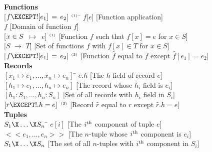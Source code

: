 \documentclass[fleqn,leqno]{article}
\newcommand{\notemark}[1]{$^{\mbox{\tiny(#1)}}$}
\begin{document}
{\begin{tabbing}
%
{\bf \hspace*{-1em}Functions}\\
{[}$f \EXCEPT ![e_{1}]\,=\,e_{2}$] \notemark{1} 
  \hspace{.5em}\= \kill
$f$[$e$] \>
  {\small [Function application]}\\
\DOMAIN $f$ \> \small [Domain of function $f$] \\
{[}$x\in S$~$\mapsto$\ $\!e$] \notemark{1} 
  \> \small [Function $f$ such that $f[x]=e$ for $x\in S$]\\
{[}$S$ $\rightarrow$ $T$]
  \> \small [Set of functions $f$ with $f[x]\in T$ for 
             $x\in S$]            \\
{[}$f \EXCEPT ![e_{1}]\,=\,e_{2}$] \notemark{3} 
  \> \small [Function $\widehat{f}$ equal to $f$ except 
             $\widehat{f}[e_{1}]=e_{2}$]%
\\[.875\baselineskip]
%
{\bf \hspace*{-1em}Records}\\
$[ x_1 \mapsto e_1, \ldots , x_n \mapsto e_n ]$
  \hspace{.5em}\= \kill
$e.h$     
\> \small [The $h$-field of record $e$] \\
$[ h_1 \mapsto e_1, \ldots , h_n \mapsto e_n ]$
  \> \small [The record whose $h_i$ field is $e_i$]\\
$[ h_1 : S_1, \ldots , h_n : S_n ]$ 
 \> \small [Set of all records with $h_i$ field in $S_i$]\\
$[ r \EXCEPT  !.h=e]$ \notemark{3} 
  \> \small [Record $\widehat{r}$ equal to $r$ except 
             $\widehat{r}.h=e$]%
\\[.875\baselineskip]
%
{\bf \hspace*{-1em}Tuples}\\
 $S_1 \X \ldots \X S_n$ 
 \hspace{.5em}\= \kill
%
$e[i]$  \>   \small [The $i^{\rm th}$ component of tuple $e$]\\
$<<e_1, \ldots , e_n>>$
  \> \small [The $n$-tuple whose $i^{\rm th}$ component is 
            $e_i$]\\
$S_1 \X \ldots \X S_n$
   \> \small [The set of all $n$-tuples with $i^{\rm th}$ component in $S_i$]
%


\end{tabbing}}
\end{document}
